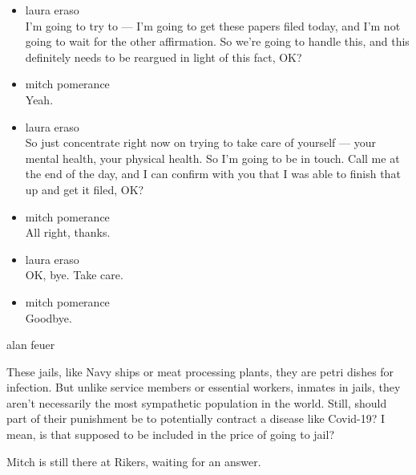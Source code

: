 \begin{itemize}
\item
  laura eraso\\
  I'm going to try to --- I'm going to get these papers filed today, and
  I'm not going to wait for the other affirmation. So we're going to
  handle this, and this definitely needs to be reargued in light of this
  fact, OK?
\item
  mitch pomerance\\
  Yeah.
\item
  laura eraso\\
  So just concentrate right now on trying to take care of yourself ---
  your mental health, your physical health. So I'm going to be in touch.
  Call me at the end of the day, and I can confirm with you that I was
  able to finish that up and get it filed, OK?
\item
  mitch pomerance\\
  All right, thanks.
\item
  laura eraso\\
  OK, bye. Take care.
\item
  mitch pomerance\\
  Goodbye.
\end{itemize}

alan feuer

These jails, like Navy ships or meat processing plants, they are petri
dishes for infection. But unlike service members or essential workers,
inmates in jails, they aren't necessarily the most sympathetic
population in the world. Still, should part of their punishment be to
potentially contract a disease like Covid-19? I mean, is that supposed
to be included in the price of going to jail?

Mitch is still there at Rikers, waiting for an answer.

